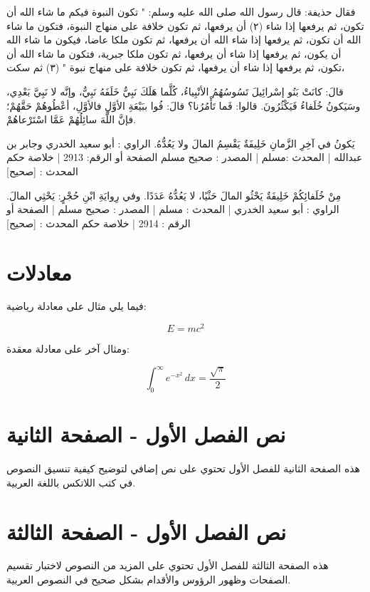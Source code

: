 فقال حذيفة: قال رسول الله صلى الله عليه وسلم: " تكون النبوة فيكم ما شاء الله أن تكون، ثم يرفعها إذا شاء (٢) أن يرفعها، ثم تكون خلافة على منهاج النبوة، فتكون ما شاء الله أن تكون، ثم يرفعها إذا شاء الله أن يرفعها، ثم تكون ملكا عاضا، فيكون ما شاء الله أن يكون، ثم يرفعها إذا شاء أن يرفعها، ثم تكون ملكا جبرية، فتكون ما شاء الله أن تكون، ثم يرفعها إذا شاء أن يرفعها، ثم تكون خلافة على منهاج نبوة " (٣) ثم سكت،

\href{https://shamela.ws/book/25794/14930#p2}{\faExternalLink}

قالَ: كانَتْ بَنُو إسْرائِيلَ تَسُوسُهُمُ الأنْبِياءُ، كُلَّما هَلَكَ نَبِيٌّ خَلَفَهُ نَبِيٌّ، وإنَّه لا نَبِيَّ بَعْدِي، وسَيَكونُ خُلَفاءُ فَيَكْثُرُونَ. قالوا: فَما تَأْمُرُنا؟ قالَ: فُوا ببَيْعَةِ الأوَّلِ فالأوَّلِ، أعْطُوهُمْ حَقَّهُمْ؛ فإنَّ اللَّهَ سائِلُهُمْ عَمَّا اسْتَرْعاهُمْ.

يَكونُ في آخِرِ الزَّمانِ خَلِيفَةٌ يَقْسِمُ المالَ ولا يَعُدُّهُ.
الراوي : أبو سعيد الخدري وجابر بن عبدالله | المحدث :مسلم | المصدر : صحيح مسلم
الصفحة أو الرقم: 2913 | خلاصة حكم المحدث : [صحيح]


مِنْ خُلَفائِكُمْ خَلِيفَةٌ يَحْثُو المالَ حَثْيًا، لا يَعُدُّهُ عَدَدًا. وفي رِوايَةِ ابْنِ حُجْرٍ: يَحْثِي المالَ.
الراوي : أبو سعيد الخدري | المحدث : مسلم | المصدر : صحيح مسلم | الصفحة أو الرقم : 2914 | خلاصة حكم المحدث : [صحيح]
   





\section{معادلات}
فيما يلي مثال على معادلة رياضية:

\begin{equation}
    E = mc^2
\end{equation}

ومثال آخر على معادلة معقدة:

\begin{equation}
    \int_0^\infty e^{-x^2} \, dx = \frac{\sqrt{\pi}}{2}
\end{equation}

\newpage

\section{نص الفصل الأول - الصفحة الثانية}

هذه الصفحة الثانية للفصل الأول تحتوي على نص إضافي لتوضيح كيفية تنسيق النصوص في كتب اللاتكس باللغة العربية.

\newpage

\section{نص الفصل الأول - الصفحة الثالثة}

هذه الصفحة الثالثة للفصل الأول تحتوي على المزيد من النصوص لاختبار تقسيم الصفحات وظهور الرؤوس والأقدام بشكل صحيح في النصوص العربية.
